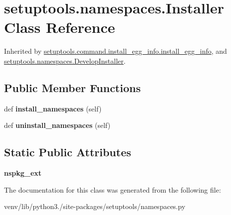 \hypertarget{classsetuptools_1_1namespaces_1_1_installer}{}\section{setuptools.\+namespaces.\+Installer Class Reference}
\label{classsetuptools_1_1namespaces_1_1_installer}


Inherited by \hyperlink{classsetuptools_1_1command_1_1install__egg__info_1_1install__egg__info}{setuptools.\+command.\+install\+\_\+egg\+\_\+info.\+install\+\_\+egg\+\_\+info}, and \hyperlink{classsetuptools_1_1namespaces_1_1_develop_installer}{setuptools.\+namespaces.\+Develop\+Installer}.

\subsection*{Public Member Functions}
\begin{DoxyCompactItemize}
\item 
\mbox{\label{classsetuptools_1_1namespaces_1_1_installer_a0fe74a62f56e2023a5b3763829e1f238}} 
def {\bfseries install\+\_\+namespaces} (self)
\item 
\mbox{\label{classsetuptools_1_1namespaces_1_1_installer_a82bca6421a59db161d2f78b6ba075092}} 
def {\bfseries uninstall\+\_\+namespaces} (self)
\end{DoxyCompactItemize}
\subsection*{Static Public Attributes}
\begin{DoxyCompactItemize}
\item 
\mbox{\label{classsetuptools_1_1namespaces_1_1_installer_a819c039a70ac64b39985e5cf6561fd97}} 
{\bfseries nspkg\+\_\+ext}
\end{DoxyCompactItemize}


The documentation for this class was generated from the following file\+:\begin{DoxyCompactItemize}
\item 
venv/lib/python3./site-\/packages/setuptools/namespaces.\+py\end{DoxyCompactItemize}
